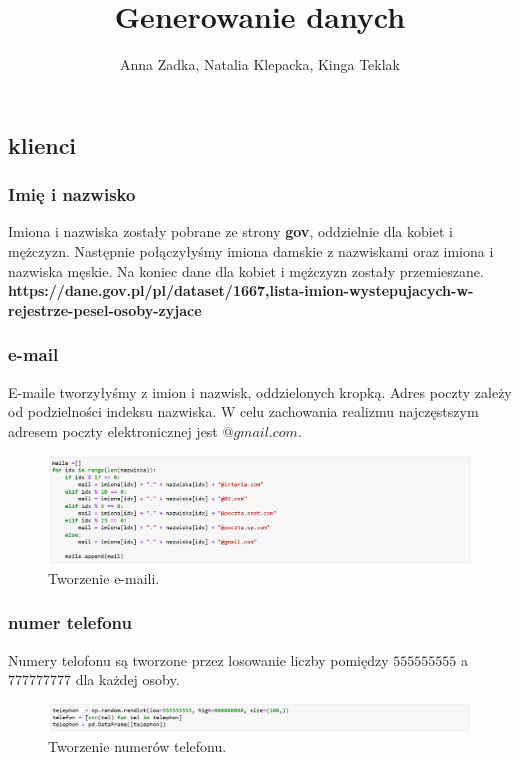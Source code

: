 \documentclass[12pt, letterpaper]{article}
\title{Generowanie danych}
\author{Anna Zadka, Natalia Klepacka, Kinga Teklak}
\begin{document}
	
\maketitle
	
\tableofcontents{}

\cleardoublepage

\subsection{klienci}
\subsubsection{Imię i nazwisko}
Imiona i nazwiska zostały pobrane ze strony \textbf{gov}, oddzielnie dla kobiet i mężczyzn. Następnie połączyłyśmy imiona damskie z nazwiskami oraz imiona i nazwiska męskie. Na koniec dane dla kobiet i mężczyzn zostały przemieszane. 
\textbf{https://dane.gov.pl/pl/dataset/1667,lista-imion-wystepujacych-w-rejestrze-pesel-osoby-zyjace}

\subsubsection{e-mail}

E-maile tworzyłyśmy z imion i nazwisk, oddzielonych kropką. Adres poczty zależy od podzielności indeksu nazwiska. W celu zachowania realizmu najczęstszym adresem poczty elektronicznej jest $@gmail.com$.

\begin{figure}[h!]
	\centering
	\includegraphics[width=1.0\textwidth]{1.png}
	\caption{Tworzenie e-maili.}
\end{figure}
\subsubsection{numer telefonu}
Numery telofonu są tworzone przez losowanie liczby pomiędzy $555555555$ a $777777777$ dla każdej osoby.
\begin{figure}[h!]
	\centering
	\includegraphics[width=1.0\textwidth]{2.png}
	\caption{Tworzenie numerów telefonu.}
\end{figure}
\end{document}
